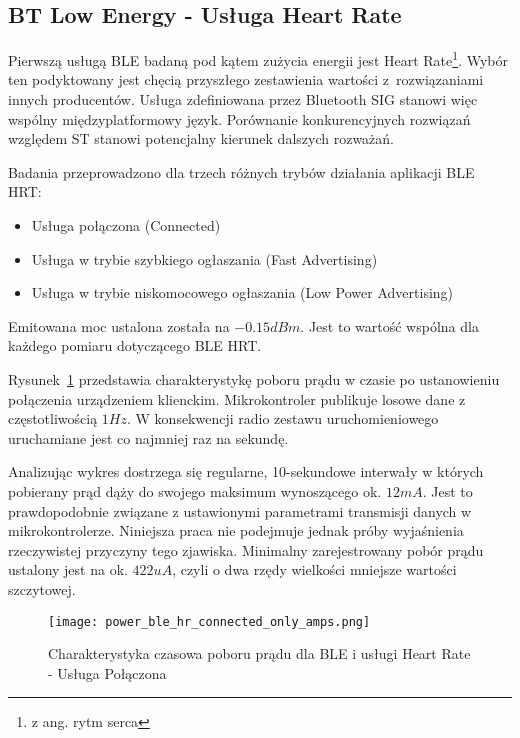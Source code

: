 \subsection{BT Low Energy - Usługa Heart Rate}

Pierwszą usługą BLE badaną pod kątem zużycia energii jest Heart Rate\footnote{z ang. rytm serca}. Wybór
ten podyktowany jest chęcią przyszłego zestawienia wartości z~rozwiązaniami innych producentów.
Usługa zdefiniowana przez Bluetooth SIG stanowi więc wspólny międzyplatformowy język.
Porównanie konkurencyjnych rozwiązań względem ST stanowi potencjalny kierunek dalszych rozważań.

Badania przeprowadzono dla trzech różnych trybów działania aplikacji BLE HRT:
\begin{itemize}
\item Usługa połączona (Connected)
\item Usługa w trybie szybkiego ogłaszania (Fast Advertising)
\item Usługa w trybie niskomocowego ogłaszania (Low Power Advertising)
\end{itemize}

Emitowana moc ustalona została na $-0.15dBm$. Jest to wartość wspólna dla każdego pomiaru
dotyczącego BLE HRT.

Rysunek~\ref{rys:power_ble_hr_connected_only_amps} przedstawia charakterystykę poboru prądu
w czasie po ustanowieniu połączenia urządzeniem klienckim. Mikrokontroler publikuje 
losowe dane z częstotliwością $1Hz$. W konsekwencji radio zestawu uruchomieniowego
uruchamiane jest co najmniej raz na sekundę.

Analizując wykres dostrzega się regularne, 10-sekundowe interwały w których pobierany prąd dąży do swojego
maksimum wynoszącego ok. $12mA$. Jest to prawdopodobnie związane z ustawionymi parametrami transmisji
danych w mikrokontrolerze. Niniejsza praca nie podejmuje jednak próby wyjaśnienia rzeczywistej przyczyny tego zjawiska.
Minimalny zarejestrowany pobór prądu ustalony jest na ok. $422uA$, czyli o dwa rzędy wielkości mniejsze wartości
szczytowej.


\begin{figure}[!ht]
	\centering \texttt{[image: power\_ble\_hr\_connected\_only\_amps.png]}
	\caption{Charakterystyka czasowa poboru prądu dla BLE i usługi Heart Rate - Usługa Połączona}
	\label{rys:power_ble_hr_connected_only_amps}
\end{figure}

